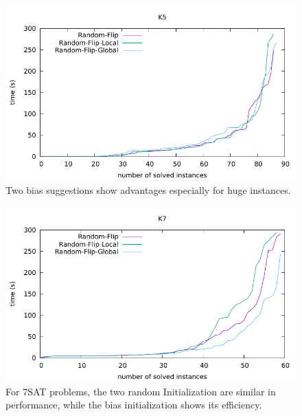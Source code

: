 \documentclass[12pt,a4paper,twoside]{scrartcl}
\numberwithin{equation}{section}
\begin{document}
  \begin{figure}[H]
\begin{center}
  \includegraphics[scale = 1]{DATA/K5/e3r.pdf}
  \end{center}
  \caption{Two bias suggestions show advantages especially for huge instances.}
  \label{Experiment 5 k5 cactus plot} 
  \end{figure}
  \begin{figure}[H]
\begin{center}
  \includegraphics[scale = 1]{DATA/K7/e3r.pdf}
  \end{center}
  \caption{For 7SAT problems, the two random Initialization are similar in performance, while the bias initialization shows its efficiency.}
  \label{Experiment 5 k7 cactus plot}
  \end{figure}
  
\end{document}

